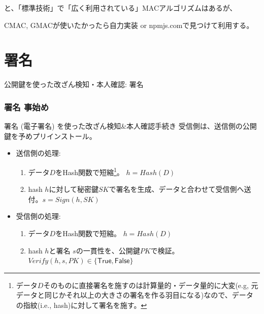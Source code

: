 \documentclass[12pt,dvipdfmx]{beamer}
\begin{document}
\begin{frame}

と、「標準技術」で「広く利用されている」MACアルゴリズムはあるが、

\vspace{2ex}

CMAC, GMACが使いたかったら自力実装 or npmjs.comで見つけて利用する。
\end{frame}

\section{署名}
\begin{frame}
\centering
{\Large 公開鍵を使った改ざん検知・本人確認: 署名}

\end{frame}

\begin{frame}
\frametitle{署名 事始め}

\begin{block}{\small 署名 (電子署名) を使った改ざん検知\&本人確認手続き}
受信側は、送信側の公開鍵を予めプリインストール。
\begin{itemize}
 \item 送信側の処理:
\begin{enumerate}
 \item データ$D$をHash関数で短縮\footnote[frame]{\scriptsize データ$D$そのものに直接署名を施すのは計算量的・データ量的に大変(e.g, 元データと同じかそれ以上の大きさの署名を作る羽目になる)なので、\alert{データの指紋(i.e., hash)に対して署名を施す}。}。
$h = \mathit{Hash}(D)$
 \item hash $h$に対して秘密鍵$\mathit{SK}$で署名を生成、データと合わせて受信側へ送付。$s = \mathit{Sign}(h, \mathit{SK})$
\end{enumerate}
 \item 受信側の処理:
\begin{enumerate}
 \item データ$D$をHash関数で短縮。
$h = \mathit{Hash}(D)$
 \item hash $h$と署名 $s$の一貫性を、公開鍵$\mathit{PK}$で検証。$\mathit{Verify}(h, s, \mathit{PK}) \in \{\mathsf{True}, \mathsf{False}\}$
\end{enumerate}
\end{itemize}
\end{block}
\end{frame}
\end{document}
